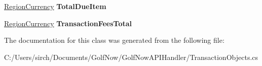 \begin{DoxyCompactItemize}
\mbox{\hyperlink{class_golf_now_a_p_i_handler_1_1_region_currency}{Region\+Currency}} {\bfseries Total\+Due\+Item}
\item 
\mbox{\label{class_golf_now_a_p_i_handler_1_1_single_player_price_ab0c22c7a1cfb34d451095cda3be1f397}} 
\mbox{\hyperlink{class_golf_now_a_p_i_handler_1_1_region_currency}{Region\+Currency}} {\bfseries Transaction\+Fees\+Total}
\end{DoxyCompactItemize}


The documentation for this class was generated from the following file\+:\begin{DoxyCompactItemize}
\item 
C\+:/\+Users/sirch/\+Documents/\+Golf\+Now/\+Golf\+Now\+A\+P\+I\+Handler/Transaction\+Objects.\+cs\end{DoxyCompactItemize}
